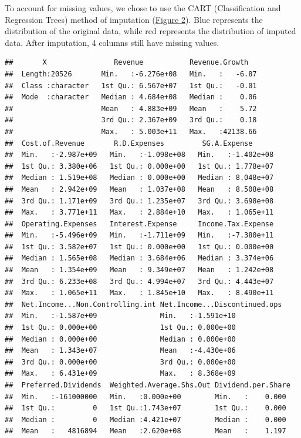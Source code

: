 \documentclass[11pt,]{article}
\begin{document}
To account for missing values, we chose to use the CART (Classification
and Regression Trees) method of imputation
(\hyperref[sec:fig2]{Figure 2}). Blue represents the distribution of the
original data, while red represents the distribution of imputed data.
After imputation, 4 columns still have missing values.

\begin{verbatim}
##       X                Revenue           Revenue.Growth    
##  Length:20526       Min.   :-6.276e+08   Min.   :   -6.87  
##  Class :character   1st Qu.: 6.567e+07   1st Qu.:   -0.01  
##  Mode  :character   Median : 4.684e+08   Median :    0.06  
##                     Mean   : 4.883e+09   Mean   :    5.72  
##                     3rd Qu.: 2.367e+09   3rd Qu.:    0.18  
##                     Max.   : 5.003e+11   Max.   :42138.66  
##  Cost.of.Revenue       R.D.Expenses         SG.A.Expense       
##  Min.   :-2.987e+09   Min.   :-1.098e+08   Min.   :-1.402e+08  
##  1st Qu.: 3.380e+06   1st Qu.: 0.000e+00   1st Qu.: 1.778e+07  
##  Median : 1.519e+08   Median : 0.000e+00   Median : 8.048e+07  
##  Mean   : 2.942e+09   Mean   : 1.037e+08   Mean   : 8.508e+08  
##  3rd Qu.: 1.171e+09   3rd Qu.: 1.235e+07   3rd Qu.: 3.698e+08  
##  Max.   : 3.771e+11   Max.   : 2.884e+10   Max.   : 1.065e+11  
##  Operating.Expenses   Interest.Expense     Income.Tax.Expense  
##  Min.   :-5.496e+09   Min.   :-1.711e+09   Min.   :-7.380e+11  
##  1st Qu.: 3.582e+07   1st Qu.: 0.000e+00   1st Qu.: 0.000e+00  
##  Median : 1.565e+08   Median : 3.684e+06   Median : 3.374e+06  
##  Mean   : 1.354e+09   Mean   : 9.349e+07   Mean   : 1.242e+08  
##  3rd Qu.: 6.233e+08   3rd Qu.: 4.994e+07   3rd Qu.: 4.443e+07  
##  Max.   : 1.065e+11   Max.   : 1.845e+10   Max.   : 8.490e+11  
##  Net.Income...Non.Controlling.int Net.Income...Discontinued.ops
##  Min.   :-1.587e+09               Min.   :-1.591e+10           
##  1st Qu.: 0.000e+00               1st Qu.: 0.000e+00           
##  Median : 0.000e+00               Median : 0.000e+00           
##  Mean   : 1.343e+07               Mean   :-4.430e+06           
##  3rd Qu.: 0.000e+00               3rd Qu.: 0.000e+00           
##  Max.   : 6.431e+09               Max.   : 8.368e+09           
##  Preferred.Dividends  Weighted.Average.Shs.Out Dividend.per.Share 
##  Min.   :-161000000   Min.   :0.000e+00        Min.   :    0.000  
##  1st Qu.:         0   1st Qu.:1.743e+07        1st Qu.:    0.000  
##  Median :         0   Median :4.421e+07        Median :    0.000  
##  Mean   :   4816894   Mean   :2.620e+08        Mean   :    1.197  

\end{verbatim}
\end{document}

